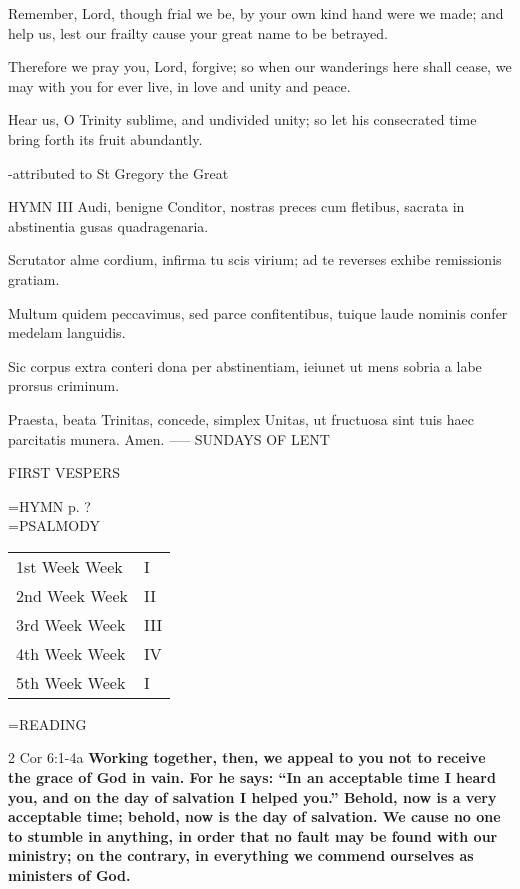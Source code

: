 Remember, Lord, though frial we be,
by your own kind hand were we made;
and help us, lest our frailty
cause your great name to be betrayed.

Therefore we pray you, Lord, forgive;
so when our wanderings here shall cease,
we may with you for ever live,
in love and unity and peace.

Hear us, O Trinity sublime,
and undivided unity;
so let his consecrated time
bring forth its fruit abundantly.

-attributed to St Gregory the Great

HYMN III
Audi, benigne Conditor,
nostras preces cum fletibus,
sacrata in abstinentia
gusas quadragenaria.

Scrutator alme cordium,
infirma tu scis virium;
ad te reverses exhibe
remissionis gratiam.

Multum quidem peccavimus,
sed parce confitentibus,
tuique laude nominis
confer medelam languidis.

Sic corpus extra conteri
dona per abstinentiam,
ieiunet ut mens sobria
a labe prorsus criminum.

Praesta, beata Trinitas,
concede, simplex Unitas,
ut fructuosa sint tuis
haec parcitatis munera. Amen.
-----
SUNDAYS OF LENT
\begin{flushleft}\normalsize FIRST VESPERS\\\end{flushleft}
\hangindent=\parindent \small{\uppercase{HYMN} p.  ?\\}
\hangindent=\parindent \small{PSALMODY}
\begin{center}
\begin{tabular}{ l l }
1st Week	Week &  I\\
2nd Week	Week &  II\\
3rd Week	Week &  III\\
4th Week	Week &  IV\\
5th Week	Week &  I\\
\end{tabular}
\end{center}		

\hangindent=\parindent \small READING
\begin{description}[labelindent=\parindent, leftmargin=*]
\item [Weeks 1-4:]     2 Cor 6:1-4a \textbf{    Working together, then, we appeal to you not to receive the grace of God in vain. For he says: “In an acceptable time I heard you, and on the day of salvation I helped you.” Behold, now is a very acceptable time; behold, now is the day of salvation. We cause no one to stumble in anything, in order that no fault may be found with our ministry; on the contrary, in everything we commend ourselves as ministers of God.}
\end{description}

